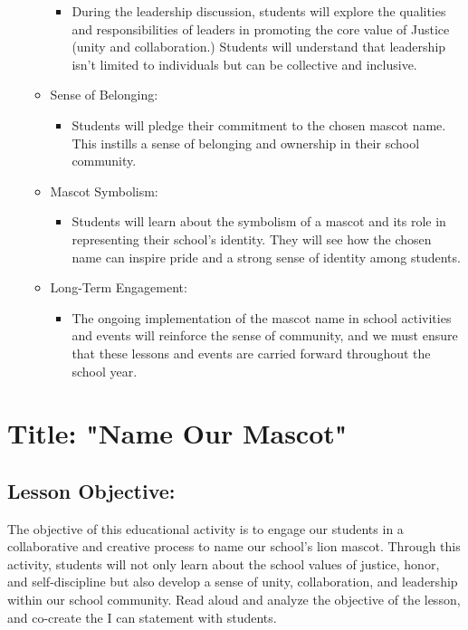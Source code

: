 \documentclass[14pt, letterpaper, twoside]{article}
\begin{document}
\begin{itemize}
\begin{itemize}
\begin{itemize}
			\item During the leadership discussion, students will explore the qualities and responsibilities of leaders in promoting the core value of Justice (unity and collaboration.) Students will understand that leadership isn't limited to individuals but can be collective and inclusive.
			\end{itemize}
     	\item Sense of Belonging:
    			\begin{itemize}
    			\item Students will pledge their commitment to the chosen mascot name. This instills a sense of belonging and ownership in their school community.
    			\end{itemize}
		\item Mascot Symbolism:
			\begin{itemize}
			\item Students will learn about the symbolism of a mascot and its role in representing their school's 					identity. They will see how the chosen name can inspire pride and a strong sense of identity among 					students.
			\end{itemize}
		\item Long-Term Engagement:
			\begin{itemize}
			\item The ongoing implementation of the mascot name in school activities and events will reinforce the sense of community, and we must ensure that these lessons and events are carried forward throughout the school year.
			\end{itemize}
		\end{itemize}
	\end{itemize}
\section{Title: "Name Our Mascot"}

	\subsection{Lesson Objective:}

	The objective of this educational activity is to engage our students in a collaborative and 				creative process to name our school's lion mascot. Through this activity, students will not only learn about the school values of justice, honor, and self-discipline but also develop a sense of unity, collaboration, and 	leadership within our school community. Read aloud and analyze the objective of the lesson, and co-create the I can statement with students.
	
\end{document}
